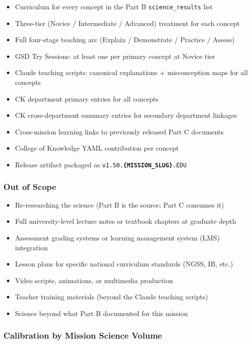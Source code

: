 \documentclass[11pt,letterpaper]{article}
\newcommand{\param}[1]{\textcolor{paramred}{\textbf{\{#1\}}}}
\begin{document}
\begin{itemize}[leftmargin=*]
  \item Curriculum for every concept in the Part B \texttt{science\_results} list
  \item Three-tier (Novice / Intermediate / Advanced) treatment for each concept
  \item Full four-stage teaching arc (Explain / Demonstrate / Practice / Assess)
  \item GSD Try Sessions: at least one per primary concept at Novice tier
  \item Claude teaching scripts: canonical explanations + misconception maps for all concepts
  \item CK department primary entries for all concepts
  \item CK cross-department summary entries for secondary department linkages
  \item Cross-mission learning links to previously released Part C documents
  \item College of Knowledge YAML contribution per concept
  \item Release artifact packaged as \texttt{v1.50.\param{MISSION\_SLUG}.EDU}
\end{itemize}

\subsubsection{Out of Scope}

\begin{itemize}[leftmargin=*]
  \item Re-researching the science (Part B is the source; Part C consumes it)
  \item Full university-level lecture notes or textbook chapters at graduate depth
  \item Assessment grading systems or learning management system (LMS) integration
  \item Lesson plans for specific national curriculum standards (NGSS, IB, etc.)
  \item Video scripts, animations, or multimedia production
  \item Teacher training materials (beyond the Claude teaching scripts)
  \item Science beyond what Part B documented for this mission
\end{itemize}

\subsubsection{Calibration by Mission Science Volume}
\end{document}
